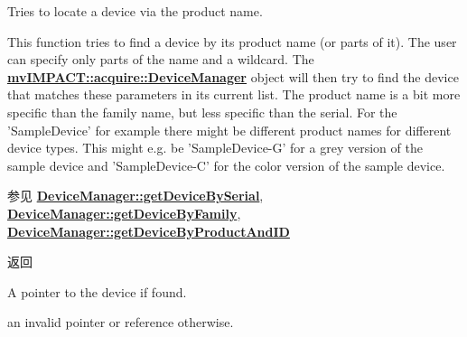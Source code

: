 Tries to locate a device via the product name. 

This function tries to find a device by its product name (or parts of it). The user can specify only parts of the name and a wildcard. The {\bfseries \hyperlink{classmv_i_m_p_a_c_t_1_1acquire_1_1_device_manager}{mv\+I\+M\+P\+A\+C\+T\+::acquire\+::\+Device\+Manager}} object will then try to find the device that matches these parameters in its current list. The product name is a bit more specific than the family name, but less specific than the serial. For the 'Sample\+Device' for example there might be different product names for different device types. This might e.\+g. be 'Sample\+Device-\/\+G' for a grey version of the sample device and 'Sample\+Device-\/\+C' for the color version of the sample device.

\begin{DoxySeeAlso}{参见}
{\bfseries \hyperlink{classmv_i_m_p_a_c_t_1_1acquire_1_1_device_manager_a7bf58516da0597acf3d899981e52aa92}{Device\+Manager\+::get\+Device\+By\+Serial}}, ~\newline
 {\bfseries \hyperlink{classmv_i_m_p_a_c_t_1_1acquire_1_1_device_manager_a8ffbf3573bd8836d2583b271b5f43834}{Device\+Manager\+::get\+Device\+By\+Family}}, ~\newline
 {\bfseries \hyperlink{classmv_i_m_p_a_c_t_1_1acquire_1_1_device_manager_ad92a73317e3dbd9443c3a7dd8bff6118}{Device\+Manager\+::get\+Device\+By\+Product\+And\+I\+D}} 
\end{DoxySeeAlso}
\begin{DoxyReturn}{返回}

\begin{DoxyItemize}
\item A pointer to the device if found. ~\newline

\item an invalid pointer or reference otherwise. 
\end{DoxyItemize}
\end{DoxyReturn}

